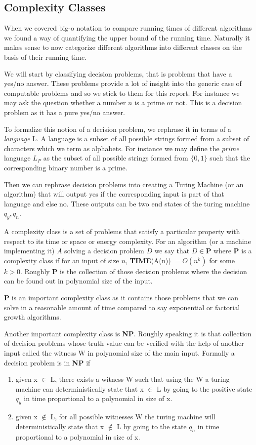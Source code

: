 \subsection{Complexity Classes}
When we covered big-o notation to compare running times of different algorithms we found a way of quantifying the upper bound of the running time. Naturally it makes sense to now categorize different algorithms into different classes on the basis of their running time.

We will start by classifying decision problems, that is problems that have a yes/no answer. These problems provide a lot of insight into the generic case of computable problems and so we stick to them for this report. For instance we may ask the question whether a  number $n$ is a prime or not. This is a decision problem as it has a pure yes/no answer.

To formalize this notion of a decision problem, we rephrase it in terms of a \textit{language} L. A language is a subset of all possible strings formed from a subset of characters which we term as alphabets. For instance we may define the \textit{prime} language $L_P$ as the subset of all possible strings formed from $\{0, 1\}$ such that the corresponding binary number is a prime.

Then we can rephrase decision problems into creating a Turing Machine (or an algorithm) that will output yes if the corresponding input is part of that language and else no. These outputs can be two end states of the turing machine $q_y, q_n$.

A complexity class is a set of problems that satisfy a particular property with respect to its time or space or energy complexity.
For an algorithm (or a machine implementing it) $A$ solving a decision problem $D$ we say that $D \in \textbf{P}$ where \textbf{P} is a complexity class if for an input of size $n$, \textbf{TIME}(A(n)) $ = O(n^k)$ for some $k>0$.
Roughly $\textbf{P}$ is the collection of those decision problems where the decision can be found out in polynomial size of the input.

\textbf{P} is an important complexity class as it contains those problems that we can solve in a reasonable amount of time compared to say exponential or factorial growth algorithms. 

Another important complexity class is \textbf{NP}. Roughly speaking it is that collection of decision problems whose truth value can be verified with the help of another input called the witness W in polynomial size of the main input.
Formally a decision problem is in \textbf{NP} if
\begin{enumerate}
    \item given x $\in $ L, there exists a witness W such that using the W a turing machine can deterministically state that x $\in$ L by going to the positive state $q_y$ in time proportional to a polynomial in size of x.
     \item given x $\not\in $ L, for all possible witnesses W the turing machine will deterministically state that x $\not\in$ L by going to the  state $q_n$ in time proportional to a polynomial in size of x.
\end{enumerate}

